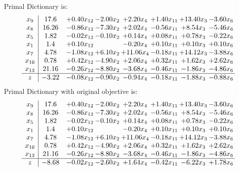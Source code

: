 \documentclass[8pt]{article}
\begin{document}
Primal Dictionary is:
\[\begin{array}{c| c c@{\hskip 2pt} c@{\hskip 2pt} c@{\hskip 2pt} c@{\hskip 2pt} c@{\hskip 2pt} c@{\hskip 2pt} }
 x_{9}   &  17.6 & +  0.40 x_{12} & -2.00 x_{2} & +  2.20 x_{4} & +  1.40 x_{11} & + 13.40 x_{3} & -3.60 x_{6}\\
 x_{8}   &  16.26 & -0.86 x_{12} & -7.30 x_{2} & +  2.02 x_{4} & -0.56 x_{11} & +  8.54 x_{3} & -5.46 x_{6}\\
 x_{5}   &  1.82 & -0.02 x_{12} & -0.10 x_{2} & +  0.14 x_{4} & +  0.08 x_{11} & +  0.78 x_{3} & -0.22 x_{6}\\
 x_{1}   &  1.4 & +  0.10 x_{12} &   & -0.20 x_{4} & +  0.10 x_{11} & +  0.10 x_{3} & +  0.10 x_{6}\\
 x_{7}   &  4.78 & -1.08 x_{12} & +  6.10 x_{2} & + 11.06 x_{4} & -0.18 x_{11} & + 14.12 x_{3} & -3.88 x_{6}\\
 x_{10}   &  0.78 & +  0.42 x_{12} & -4.90 x_{2} & +  2.06 x_{4} & +  0.32 x_{11} & +  1.62 x_{3} & +  2.62 x_{6}\\
 x_{13}   &  21.16 & -0.26 x_{12} & -8.80 x_{2} & -3.68 x_{4} & -0.46 x_{11} & -1.86 x_{3} & -4.86 x_{6}\\
\hline
z    &  -3.22 & -0.08 x_{12} & -0.90 x_{2} & -0.94 x_{4} & -0.18 x_{11} & -1.88 x_{3} & -0.88 x_{6}\\
\end{array}\]
Primal Dictionary with original objective is:
\[\begin{array}{c| c c@{\hskip 2pt} c@{\hskip 2pt} c@{\hskip 2pt} c@{\hskip 2pt} c@{\hskip 2pt} c@{\hskip 2pt} }
 x_{9}   &  17.6 & +  0.40 x_{12} & -2.00 x_{2} & +  2.20 x_{4} & +  1.40 x_{11} & + 13.40 x_{3} & -3.60 x_{6}\\
 x_{8}   &  16.26 & -0.86 x_{12} & -7.30 x_{2} & +  2.02 x_{4} & -0.56 x_{11} & +  8.54 x_{3} & -5.46 x_{6}\\
 x_{5}   &  1.82 & -0.02 x_{12} & -0.10 x_{2} & +  0.14 x_{4} & +  0.08 x_{11} & +  0.78 x_{3} & -0.22 x_{6}\\
 x_{1}   &  1.4 & +  0.10 x_{12} &   & -0.20 x_{4} & +  0.10 x_{11} & +  0.10 x_{3} & +  0.10 x_{6}\\
 x_{7}   &  4.78 & -1.08 x_{12} & +  6.10 x_{2} & + 11.06 x_{4} & -0.18 x_{11} & + 14.12 x_{3} & -3.88 x_{6}\\
 x_{10}   &  0.78 & +  0.42 x_{12} & -4.90 x_{2} & +  2.06 x_{4} & +  0.32 x_{11} & +  1.62 x_{3} & +  2.62 x_{6}\\
 x_{13}   &  21.16 & -0.26 x_{12} & -8.80 x_{2} & -3.68 x_{4} & -0.46 x_{11} & -1.86 x_{3} & -4.86 x_{6}\\
\hline
z    &  -8.68 & -0.02 x_{12} & -2.60 x_{2} & +  1.64 x_{4} & -0.42 x_{11} & -6.22 x_{3} & +  1.78 x_{6}\\
\end{array}\]
\end{document}
